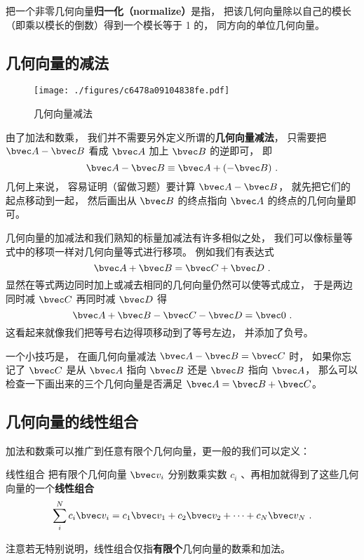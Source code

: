 把一个非零几何向量\textbf{归一化（normalize）}是指， 把该几何向量除以自己的模长（即乘以模长的倒数）得到一个模长等于 1 的， 同方向的单位几何向量。

\subsection{几何向量的减法}

\begin{figure}[ht]
\centering
\texttt{[image: ./figures/c6478a09104838fe.pdf]}
\caption{几何向量减法} \label{fig_GVecOp_3}
\end{figure}
由了加法和数乘， 我们并不需要另外定义所谓的\textbf{几何向量减法}， 只需要把 $\bvec A - \bvec B$ 看成 $\bvec A$ 加上 $\bvec B$ 的逆即可， 即
\begin{equation}
\bvec A - \bvec B \equiv \bvec A + (-\bvec B)~.
\end{equation}
几何上来说， 容易证明（留做习题）要计算 $\bvec A - \bvec B$， 就先把它们的起点移动到一起， 然后画出从 $\bvec B$ 的终点指向 $\bvec A$ 的终点的几何向量即可。

几何向量的加减法和我们熟知的标量加减法有许多相似之处， 我们可以像标量等式中的移项一样对几何向量等式进行移项。 例如我们有表达式
\begin{equation}
\bvec A + \bvec B = \bvec C + \bvec D~.
\end{equation}
显然在等式两边同时加上或减去相同的几何向量仍然可以使等式成立， 于是两边同时减 $\bvec C$ 再同时减 $\bvec D$ 得
\begin{equation}
\bvec A + \bvec B - \bvec C - \bvec D = \bvec 0~.
\end{equation}
这看起来就像我们把等号右边得项移动到了等号左边， 并添加了负号。

一个小技巧是， 在画几何向量减法 $\bvec A - \bvec B = \bvec C$ 时， 如果你忘记了 $\bvec C$ 是从 $\bvec A$ 指向 $\bvec B$ 还是 $\bvec B$ 指向 $\bvec A$， 那么可以检查一下画出来的三个几何向量是否满足 $\bvec A = \bvec B + \bvec C$。


\subsection{几何向量的线性组合}

加法和数乘可以推广到任意有限个几何向量，更一般的我们可以定义：
\begin{definition}{线性组合}
把有限个几何向量 $\bvec v_i$ 分别数乘实数 $c_i$ 、再相加就得到了这些几何向量的一个\textbf{线性组合}
\begin{equation}\label{eq_GVecOp_1}
\sum_i^N c_i \bvec v_i = c_1\bvec v_1 + c_2\bvec v_2 +\dots +c_N \bvec v_N~.
\end{equation}
\end{definition}
注意若无特别说明，线性组合仅指\textbf{有限个}几何向量的数乘和加法。


